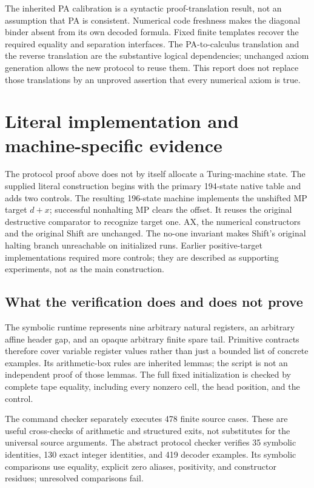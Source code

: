 \documentclass[11pt,letterpaper]{article}
\begin{document}
The inherited PA calibration is a syntactic proof-translation result,
not an assumption that PA is consistent. Numerical code freshness makes
the diagonal binder absent from its own decoded formula. Fixed finite
templates recover the required equality and separation interfaces. The
PA-to-calculus translation and the reverse translation are the substantive
logical dependencies; unchanged axiom generation allows the new protocol
to reuse them. This report does not replace those translations by an
unproved assertion that every numerical axiom is true.



\section{Literal implementation and machine-specific evidence}
\label{sec:literal}

The protocol proof above does not by itself allocate a Turing-machine
state. The supplied literal construction begins with the primary
194-state native table and adds two controls. The resulting 196-state
machine implements the unshifted MP target $d+x$; successful nonhalting
MP clears the offset. It reuses the original destructive comparator to
recognize target one. AX, the numerical constructors and the original
Shift are unchanged. The no-one invariant makes Shift's original halting
branch unreachable on initialized runs. Earlier positive-target
implementations required more controls; they are described as supporting
experiments, not as the main construction.



\subsection{What the verification does and does not prove}

The symbolic runtime represents nine arbitrary natural registers, an
arbitrary affine header gap, and an opaque arbitrary finite spare tail.
Primitive contracts therefore cover variable register values rather than
just a bounded list of concrete examples. Its arithmetic-box rules are
inherited lemmas; the script is not an independent proof of those lemmas.
The full fixed initialization is checked by complete tape equality,
including every nonzero cell, the head position, and the control.

The command checker separately executes 478 finite source cases. These
are useful cross-checks of arithmetic and structured exits, not substitutes
for the universal source arguments. The abstract protocol checker verifies
35 symbolic identities, 130 exact integer identities, and 419 decoder
examples. Its symbolic comparisons use equality, explicit zero aliases,
positivity, and constructor residues; unresolved comparisons fail.
\end{document}
